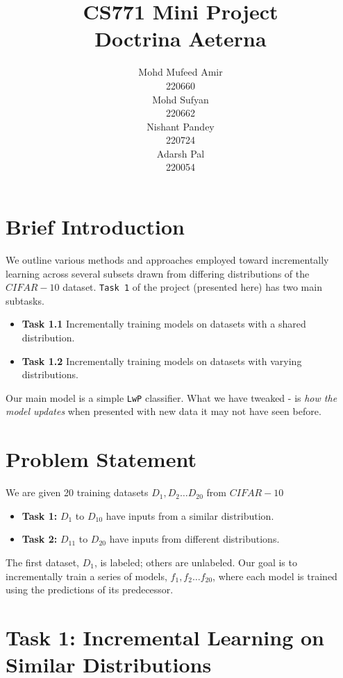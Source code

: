 \documentclass{article} %
\title{CS771 Mini Project\\Doctrina Aeterna}
\author{
Mohd Mufeed Amir\\
220660\\
\And
Mohd Sufyan\\
220662\\
\AND
Nishant Pandey\\
220724\\
\And
Adarsh Pal\\
220054\\
}
\begin{document}
\setlength{\itemsep}{0pt}

\maketitle
\section{Brief Introduction}
We outline various methods and approaches employed toward incrementally learning across several subsets drawn from differing distributions of the $CIFAR-10$ dataset. \texttt{Task 1} of the project (presented here) has two main subtasks.
\begin{itemize}
    \item \textbf{Task 1.1} Incrementally training models on datasets with a shared distribution.
    \item \textbf{Task 1.2} Incrementally training models on datasets with varying distributions.
\end{itemize}
Our main model is a simple \texttt{LwP} classifier. What we have tweaked - is \textit{how the model updates} when presented with new data it may not have seen before.

\vspace{-5pt}
\section{Problem Statement}
We are given 20 training datasets $D_1, D_2 \dots D_{20}$ from $CIFAR-10$
\begin{itemize}
    \item \textbf{Task 1:} $D_1$ to $D_{10}$ have inputs from a similar distribution.
    \item \textbf{Task 2:} $D_{11}$ to $D_{20}$ have inputs from different distributions.
\end{itemize}
The first dataset, $D_1$, is labeled; others are unlabeled. Our goal is to incrementally train a series of models, $f_1, f_2 \dots f_{20}$, where each model is trained using the predictions of its predecessor. 

\section{Task 1: Incremental Learning on Similar Distributions}
\end{document}
